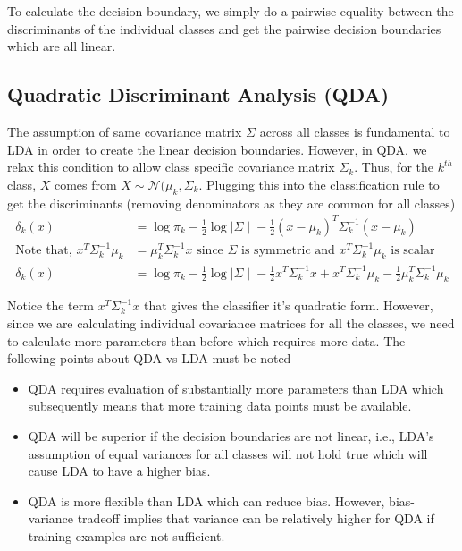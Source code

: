 \documentclass[../statistical_learning_notes.tex]{subfiles}
\begin{document}
    To calculate the decision boundary, we simply do a pairwise equality between the discriminants of the individual classes and get the pairwise decision boundaries which are all linear.

    
    \subsection{Quadratic Discriminant Analysis (QDA)}
    The assumption of same covariance matrix $\Sigma$ across all classes is fundamental to LDA in order to create the linear decision boundaries. \newline
    However, in QDA, we relax this condition to allow class specific covariance matrix $\Sigma_{k}$. Thus, for the $k^{th}$ class, $X$ comes from $X \sim \mathcal{N}(\mu_{k}, \Sigma_{k}$. \newline
    Plugging this into the classification rule to get the discriminants (removing denominators as they are common for all classes)
    \begin{align*}
        \delta_{k}(x) &= \log{\pi_{k}} -\frac{1}{2}\log{\mid\Sigma \mid} - \frac{1}{2}(x-\mu_{k})^{T}\Sigma_{k}^{-1}(x-\mu_{k}) \\
        \text{Note that, } x^{T}\Sigma_{k}^{-1}\mu_{k} &= \mu_{k}^{T}\Sigma_{k}^{-1}x \text{  since $\Sigma$ is symmetric and $x^{T}\Sigma_{k}^{-1}\mu_{k}$ is scalar} \\
        \delta_{k}(x) &= \log{\pi_{k}} -\frac{1}{2}\log{\mid\Sigma \mid} - \frac{1}{2}x^{T}\Sigma_{k}^{-1}x + x^{T}\Sigma_{k}^{-1}\mu_{k} -\frac{1}{2}\mu_{k}^{T}\Sigma_{k}^{-1}\mu_{k}
    \end{align*}

    Notice the term $x^{T}\Sigma_{k}^{-1}x$ that gives the classifier it's quadratic form. \newline
    However, since we are calculating individual covariance matrices for all the classes, we need to calculate more parameters than before which requires more data. \newline
    The following points about QDA vs LDA must be noted
    \begin{itemize}
        \item QDA requires evaluation of substantially more parameters than LDA which subsequently means that more training data points must be available.
        \item QDA will be superior if the decision boundaries are not linear, i.e., LDA's assumption of equal variances for all classes will not hold true which will cause LDA to have a higher bias.
        \item QDA is more flexible than LDA which can reduce bias. However, bias-variance tradeoff implies that variance can be relatively higher for QDA if training examples are not sufficient.
    \end{itemize}
\end{document}
